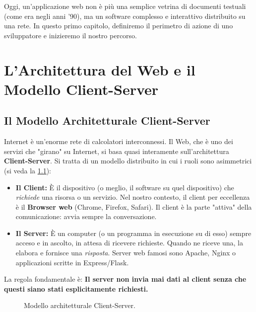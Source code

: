 \documentclass[11pt,a4paper]{report}
\begin{document}
Oggi, un'applicazione web non è più una semplice vetrina di documenti testuali (come era negli anni '90), ma un software complesso e interattivo distribuito su una rete. In questo primo capitolo, definiremo il perimetro di azione di uno sviluppatore e inizieremo il nostro percorso.

\chapter{L'Architettura del Web e il Modello Client-Server}

\section{Il Modello Architetturale Client-Server}
Internet è un'enorme rete di calcolatori interconnessi. Il Web, che è uno dei servizi che "girano" su Internet, si basa quasi interamente sull'architettura \textbf{Client-Server}. Si tratta di un modello distribuito in cui i ruoli sono asimmetrici (si veda la \cref{fig:client_server}):

\begin{itemize}
    \item \textbf{Il Client:} È il dispositivo (o meglio, il software su quel dispositivo) che \textit{richiede} una risorsa o un servizio. Nel nostro contesto, il client per eccellenza è il \textbf{Browser web} (Chrome, Firefox, Safari). Il client è la parte "attiva" della comunicazione: avvia sempre la conversazione.
    \item \textbf{Il Server:} È un computer (o un programma in esecuzione su di esso) sempre acceso e in ascolto, in attesa di ricevere richieste. Quando ne riceve una, la elabora e fornisce una \textit{risposta}. Server web famosi sono Apache, Nginx o applicazioni scritte in Express/Flask.
\end{itemize}
La regola fondamentale è: \textbf{Il server non invia mai dati al client senza che questi siano stati esplicitamente richiesti.}

\begin{figure}[ht]
\centering
{}
\caption{Modello architetturale Client-Server.}
\label{fig:client_server}
\end{figure}
\end{document}
